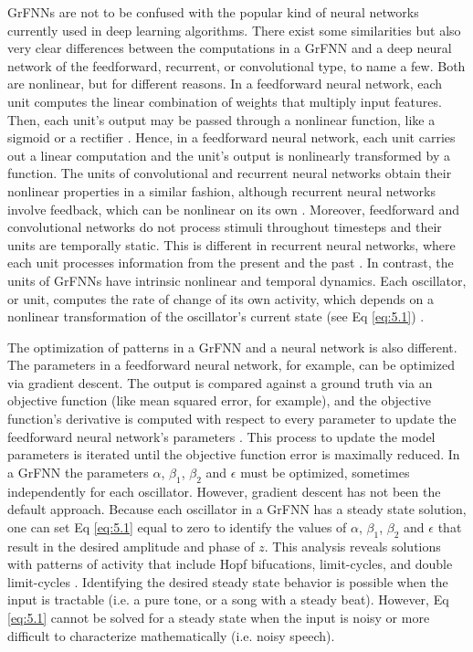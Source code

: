 \documentclass{report}
\begin{document}
GrFNNs are not to be confused with the popular kind of neural networks currently used in deep learning algorithms. There exist some similarities but also very clear differences between the computations in a GrFNN and a deep neural network of the feedforward, recurrent, or convolutional type, to name a few. Both are nonlinear, but for different reasons. In a feedforward neural network, each unit computes the linear combination of weights that multiply input features. Then, each unit’s output may be passed through a nonlinear function, like a sigmoid or a rectifier \cite{svozil1997introduction}. Hence, in a feedforward neural network, each unit carries out a linear computation and the unit’s output is nonlinearly transformed by a function. The units of convolutional and recurrent neural networks obtain their nonlinear properties in a similar fashion, although recurrent neural networks involve feedback, which can be nonlinear on its own \cite{le2015tutorial2}. Moreover, feedforward and convolutional networks do not process stimuli throughout timesteps and their units are temporally static. This is different in recurrent neural networks, where each unit processes information from the present and the past \cite{le2015tutorial2}. In contrast, the units of GrFNNs have intrinsic nonlinear and temporal dynamics. Each oscillator, or unit, computes the rate of change of its own activity, which depends on a nonlinear transformation of the oscillator's current state (see Eq \eqref{eq:5.1}) \cite{large2010canonical}. 

The optimization of patterns in a GrFNN and a neural network is also different. The parameters in a feedforward neural network, for example, can be optimized via gradient descent. The output is compared against a ground truth via an objective function (like mean squared error, for example), and the objective function’s derivative is computed with respect to every parameter to update the feedforward neural network’s parameters \cite{le2015tutorial1}. This process to update the model parameters is iterated until the objective function error is maximally reduced. In a GrFNN the parameters $\alpha$, $\beta_1$, $\beta_2$ and $\epsilon$ must be optimized, sometimes independently for each oscillator. However, gradient descent has not been the default approach. Because each oscillator in a GrFNN has a steady state solution, one can set Eq \eqref{eq:5.1} equal to zero to identify the values of $\alpha$, $\beta_1$, $\beta_2$ and $\epsilon$ that result in the desired amplitude and phase of $z$. This analysis reveals solutions with patterns of activity that include Hopf bifucations, limit-cycles, and double limit-cycles \cite{kim2015signal}. Identifying the desired steady state behavior is possible when the input is tractable (i.e. a pure tone, or a song with a steady beat). However, Eq \eqref{eq:5.1} cannot be solved for a steady state when the input is noisy or more difficult to characterize mathematically (i.e. noisy speech). 
\end{document}
